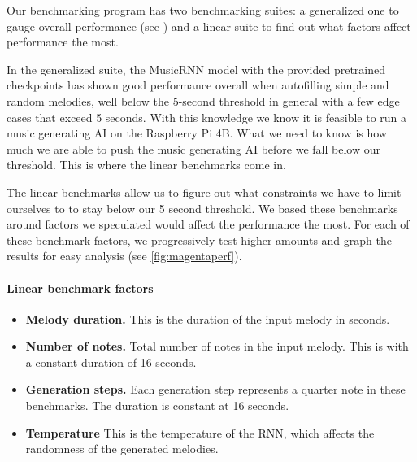 Our benchmarking program has two benchmarking suites: a generalized one to gauge overall
performance (see ) and a linear suite to find out what
factors affect performance the most.

\label{figure:magenta_benchmark}
\begin{minipage}{\linewidth}
  \begin{adjustbox}{width=\textwidth}
  \end{adjustbox}
\end{minipage}

In the generalized suite, the MusicRNN model with the provided pretrained checkpoints has
shown good performance overall when autofilling simple and random melodies, well below the
5-second threshold in general with a few edge cases that exceed 5 seconds. With this
knowledge we know it is feasible to run a music generating AI on the Raspberry Pi 4B. What
we need to know is how much we are able to push the music generating AI before we fall
below our threshold. This is where the linear benchmarks come in.

The linear benchmarks allow us to figure out what constraints we have to limit ourselves
to to stay below our 5 second threshold. We based these benchmarks around factors
we speculated would affect the performance the most. For each of these benchmark factors,
we progressively test higher amounts and graph the results for easy analysis (see
\autoref{fig:magentaperf}).

\paragraph{Linear benchmark factors}
\begin{itemize}
  \item \textbf{Melody duration.} This is the duration of the input melody in seconds.
  \item \textbf{Number of notes.} Total number of notes in the input melody. This is with
        a constant duration of 16 seconds.
  \item \textbf{Generation steps.} Each generation step represents a quarter note in these
        benchmarks. The duration is constant at 16 seconds.
  \item \textbf{Temperature} This is the temperature of the RNN, which affects the
        randomness of the generated melodies.
\end{itemize}

